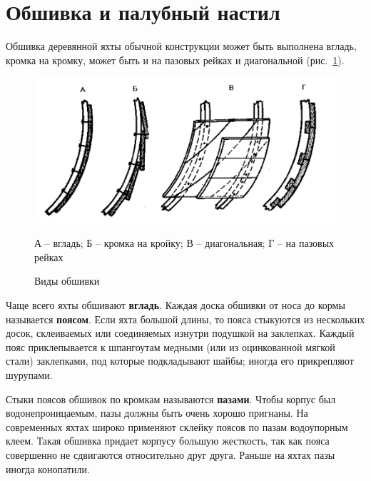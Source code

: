 \documentclass[a4paper, 12pt, twoside, final]{scrbook}
\begin{document}
%
%

\section{Обшивка и палубный настил}

Обшивка деревянной яхты обычной конструкции может быть выполнена вгладь,
кромка на кромку, может быть и на пазовых рейках и диагональной (рис.~\ref{fig:29}).

\begin{figure}[htbp]
\begin{centering}
\includegraphics{Vidy_obshivki}
\par\end{centering}

\protect\caption{\label{fig:29}Виды обшивки}


\begin{centering}\small
А \--- вгладь; Б \--- кромка на кройку; В \--- диагональная; Г \--- на пазовых рейках
\par\end{centering}

\end{figure}


Чаще всего яхты обшивают \textbf{вгладь}. Каждая доска обшивки от
носа до кормы называется \textbf{поясом}. Если яхта большой длины,
то пояса стыкуются из нескольких досок, склеиваемых или соединяемых
изнутри подушкой на заклепках. Каждый пояс приклепывается к шпангоутам
медными (или из оцинкованной мягкой стали) заклепками, под которые
подкладывают шайбы; иногда его прикрепляют шурупами.

Стыки поясов обшивок по кромкам называются \textbf{пазами}. Чтобы
корпус был водонепроницаемым, пазы должны быть очень хорошо пригнаны.
На современных яхтах широко применяют склейку поясов по пазам водоупорным
клеем. Такая обшивка придает корпусу большую жесткость, так как пояса
совершенно не сдвигаются относительно друг друга. Раньше на яхтах
пазы иногда конопатили.
\end{document}
